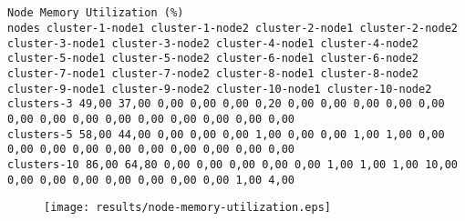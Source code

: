 \documentclass{elsart}
\begin{document}
\subsection{}

\begin{lstlisting}[caption={}]
Node Memory Utilization (%)
nodes cluster-1-node1 cluster-1-node2 cluster-2-node1 cluster-2-node2 cluster-3-node1 cluster-3-node2 cluster-4-node1 cluster-4-node2 cluster-5-node1 cluster-5-node2 cluster-6-node1 cluster-6-node2 cluster-7-node1 cluster-7-node2 cluster-8-node1 cluster-8-node2 cluster-9-node1 cluster-9-node2 cluster-10-node1 cluster-10-node2
clusters-3 49,00 37,00 0,00 0,00 0,00 0,20 0,00 0,00 0,00 0,00 0,00 0,00 0,00 0,00 0,00 0,00 0,00 0,00 0,00 0,00
clusters-5 58,00 44,00 0,00 0,00 0,00 1,00 0,00 0,00 1,00 1,00 0,00 0,00 0,00 0,00 0,00 0,00 0,00 0,00 0,00 0,00
clusters-10 86,00 64,80 0,00 0,00 0,00 0,00 0,00 1,00 1,00 1,00 10,00 0,00 0,00 0,00 0,00 0,00 0,00 0,00 1,00 4,00
\end{lstlisting}

\begin{figure}[ht]
\centering
\texttt{[image: results/node-memory-utilization.eps]}
\caption{}\label{fig:node-memory-utilization.eps}
\end{figure}
\end{document}
